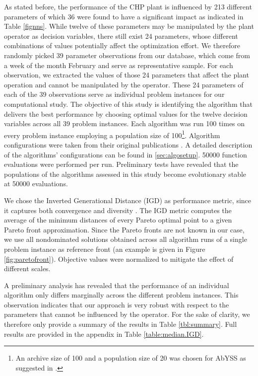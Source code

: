 As stated before, the performance of the CHP plant is influenced by 213 different parameters of which 36 were found to have a significant impact as indicated in Table \ref{fignns}. While twelve of these parameters may be manipulated by the plant operator as decision variables, there still exist 24 parameters, whose different combinations of values potentially affect the optimization effort.
%
We therefore randomly picked 39 parameter observations from our database, which come from a week of the month February and serve as representative sample. For each observation, we extracted the values of those 24 parameters that affect the plant operation and cannot be manipulated by the operator. These 24 parameters of each of the 39 observations serve as individual problem instances for our computational study. 
%
The objective of this study is identifying the algorithm that delivers the best performance by choosing optimal values for the twelve decision variables across all 39 problem instances. Each algorithm was run 100 times on every problem instance employing a population size of 100\footnote{An archive size of 100 and a population size of 20 was chosen for AbYSS as suggested in \cite{abyss}.}. Algorithm configurations were taken from their original publications \cite{abyss,espea,ibea,moead2009,nsga2,nsga3part1,smpso,smsemoa}. A detailed description of the algorithms' configurations can be found in \ref{sec:algosetup}. \num{50000} function evaluations were performed per run. Preliminary tests have revealed that the populations of the algorithms assessed in this study become evolutionary stable at \num{50000} evaluations.

We chose the Inverted Generational Distance (IGD) as performance metric, since it captures both convergence and diversity \cite{van1998evolutionary}. The IGD metric computes the average of the minimum distances of every Pareto optimal point to a given Pareto front approximation. Since the Pareto fronts are not known in our case, we use all nondominated solutions obtained across all algorithm runs of a single problem instance as reference front (an example is given in Figure \ref{fig:paretofront}). Objective values were normalized to mitigate the effect of different scales.

A preliminary analysis has revealed that the performance of an individual algorithm only differs marginally across the different problem instances. This observation indicates that our approach is very robust with respect to the parameters that cannot be influenced by the operator. For the sake of clarity, we therefore only provide a summary of the results in Table \ref{tbl:summary}. Full results are provided in the appendix in Table \ref{table:median.IGD}.

